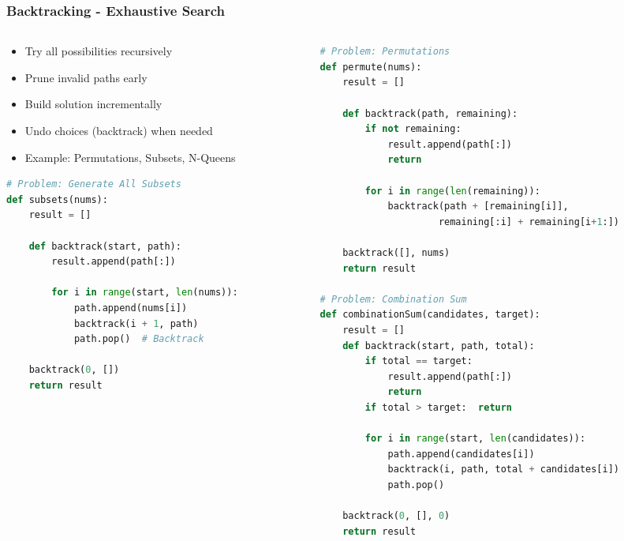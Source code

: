 \begin{frame}[fragile]\frametitle{Backtracking - Exhaustive Search}
\begin{columns}
    \begin{column}[T]{0.5\linewidth}
      \begin{itemize}
        \item Try all possibilities recursively
        \item Prune invalid paths early
        \item Build solution incrementally
        \item Undo choices (backtrack) when needed
        \item Example: Permutations, Subsets, N-Queens
      \end{itemize}
	  
     \begin{lstlisting}[language=python, basicstyle=\tiny]
# Problem: Generate All Subsets
def subsets(nums):
    result = []
    
    def backtrack(start, path):
        result.append(path[:])
        
        for i in range(start, len(nums)):
            path.append(nums[i])
            backtrack(i + 1, path)
            path.pop()  # Backtrack
    
    backtrack(0, [])
    return result
      \end{lstlisting}
	  
    \end{column}
    \begin{column}[T]{0.5\linewidth}
      \begin{lstlisting}[language=python, basicstyle=\tiny]
# Problem: Permutations
def permute(nums):
    result = []
    
    def backtrack(path, remaining):
        if not remaining:
            result.append(path[:])
            return
        
        for i in range(len(remaining)):
            backtrack(path + [remaining[i]], 
                     remaining[:i] + remaining[i+1:])
    
    backtrack([], nums)
    return result

# Problem: Combination Sum
def combinationSum(candidates, target):
    result = []
    def backtrack(start, path, total):
        if total == target:
            result.append(path[:])
            return
        if total > target:  return
        
        for i in range(start, len(candidates)):
            path.append(candidates[i])
            backtrack(i, path, total + candidates[i])
            path.pop()
    
    backtrack(0, [], 0)
    return result
      \end{lstlisting}

    \end{column}
  \end{columns}
\end{frame}


